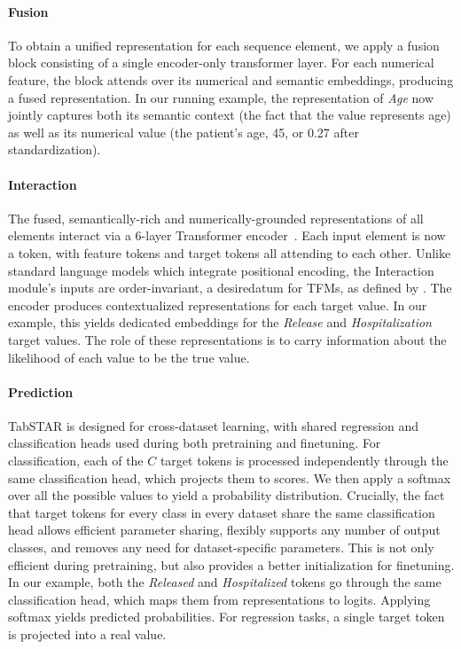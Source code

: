 \documentclass{article}
\begin{document}
\paragraph{Fusion} To obtain a unified representation for each sequence element, we apply a fusion block consisting of a single encoder-only transformer layer. For each numerical feature, the block attends over its numerical and semantic embeddings, producing a fused representation. In our running example, the representation of \textit{Age} now jointly captures both its semantic context (the fact that the value represents age) as well as its numerical value (the patient's age, 45, or 0.27 after standardization).

\paragraph{Interaction}
The fused, semantically-rich and numerically-grounded representations of all elements interact via a 6-layer Transformer encoder~\cite{vaswani_attention_2017}. Each input element is now a token, with feature tokens and target tokens all attending to each other. Unlike standard language models which integrate positional encoding, the Interaction module's inputs are order-invariant, a desiredatum for TFMs, as defined by \cite{van_breugel_position_2024}. The encoder produces contextualized representations for each target value. In our example, this yields dedicated embeddings for the \textit{Release} and \textit{Hospitalization} target values. The role of these representations is to carry information about the likelihood of each value to be the true value.

\paragraph{Prediction} TabSTAR is designed for cross-dataset learning, with shared regression and classification heads used during both pretraining and finetuning. For classification, each of the \(C\) target tokens is processed independently through the same classification head, which projects them to scores. We then apply a softmax over all the possible values to yield a probability distribution. Crucially, the fact that target tokens for every class in every dataset share the same classification head allows efficient parameter sharing, flexibly supports any number of output classes, and removes any need for dataset-specific parameters. This is not only efficient during pretraining, but also provides a better initialization for finetuning. In our example, both the \textit{Released} and \textit{Hospitalized} tokens go through the same classification head, which maps them from representations to logits. Applying softmax yields predicted probabilities. For regression tasks, a single target token is projected into a real value.
\end{document}
